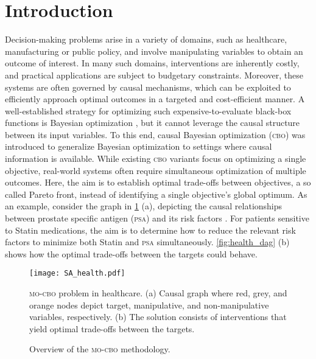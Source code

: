 \section{Introduction}\label{chap:intro}

Decision-making problems arise in a variety of domains, such as healthcare, manufacturing or public policy, and involve manipulating variables to obtain an outcome of interest. In many such domains, interventions are inherently costly, and practical applications are subject to budgetary constraints. Moreover, these systems are often governed by causal mechanisms, which can be exploited to efficiently approach optimal outcomes in a targeted and cost-efficient manner. A well-established strategy for optimizing such expensive-to-evaluate black-box functions is Bayesian optimization \cite{BO_review}, but it cannot leverage the causal structure between its input variables. To this end, causal Bayesian optimization (\textsc{cbo}) \cite{CBO} was introduced to generalize Bayesian optimization to settings where causal information is available. 
While existing \textsc{cbo} variants focus on optimizing a single objective, real-world systems often require simultaneous optimization of multiple outcomes. Here, the aim is to establish optimal trade-offs between objectives, a so called Pareto front, instead of identifying a single objective's global optimum. As an example, consider the graph in \cref{fig:health_dag} (a), depicting the causal relationships between prostate specific antigen (\textsc{psa}) and its risk factors \cite{ferro_healthcare}. For patients sensitive to Statin medications, the aim is to determine how to reduce the relevant risk factors to minimize both Statin and \textsc{psa} simultaneously. \autoref{fig:health_dag} (b) shows how the optimal trade-offs between the targets could behave.

\begin{figure}
    \centering
    \vspace{-1.2cm}
    \texttt{[image: SA\_health.pdf]}
    \vspace{-0.9cm}
    \caption{\textsc{mo-cbo} problem in healthcare. (a) Causal graph where red, grey, and orange nodes depict target, manipulative, and non-manipulative variables, respectively. (b) The solution consists of interventions that yield optimal trade-offs between the targets.}
    \label{fig:health_dag}
\end{figure}

\begin{figure*}[t]
    
    \caption{Overview of the \textsc{mo-cbo} methodology.}
    \label{fig:methodology_overview}
\end{figure*}

